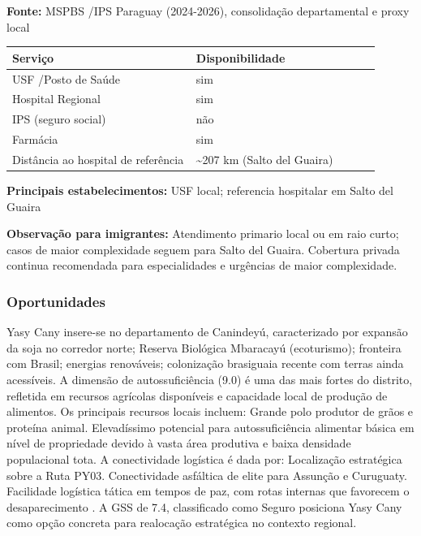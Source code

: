 \textbf{Fonte:} MSPBS /\allowbreak  IPS Paraguay (2024-2026), consolidação
departamental e proxy local

{\def\LTcaptype{none} %
\begin{longtable}{@{}>{\raggedright\arraybackslash}p{0.45\linewidth} >{\raggedright\arraybackslash}p{0.45\linewidth}@{}}
\toprule\noalign{}
Serviço & Disponibilidade \\
\midrule\noalign{}
\endhead
\bottomrule\noalign{}
\endlastfoot
USF /\allowbreak  Posto de Saúde & sim \\
Hospital Regional & sim \\
IPS (seguro social) & não \\
Farmácia & sim \\
Distância ao hospital de referência & \textasciitilde207 km (Salto del
Guaira) \\
\end{longtable}
}

\textbf{Principais estabelecimentos:} USF local; referencia hospitalar
em Salto del Guaira

\textbf{Observação para imigrantes:} Atendimento primario local ou em
raio curto; casos de maior complexidade seguem para Salto del Guaira.
Cobertura privada continua recomendada para especialidades e urgências
de maior complexidade.
\newpage

\subsubsection*{Oportunidades}\label{oport-yasy-cany-1411}
Yasy Cany insere-se no departamento de Canindeyú, caracterizado por expansão da soja no corredor norte; Reserva Biológica Mbaracayú (ecoturismo); fronteira com Brasil; energias renováveis; colonização brasiguaia recente com terras ainda acessíveis. A dimensão de autossuficiência (9.0) é uma das mais fortes do distrito, refletida em recursos agrícolas disponíveis e capacidade local de produção de alimentos. Os principais recursos locais incluem: Grande polo produtor de grãos e proteína animal. Elevadíssimo potencial para autossuficiência alimentar básica em nível de propriedade devido à vasta área produtiva e baixa densidade populacional tota. A conectividade logística é dada por: Localização estratégica sobre a Ruta PY03. Conectividade asfáltica de elite para Assunção e Curuguaty. Facilidade logística tática em tempos de paz, com rotas internas que favorecem o desaparecimento . A GSS de 7.4, classificado como Seguro posiciona Yasy Cany como opção concreta para realocação estratégica no contexto regional.

